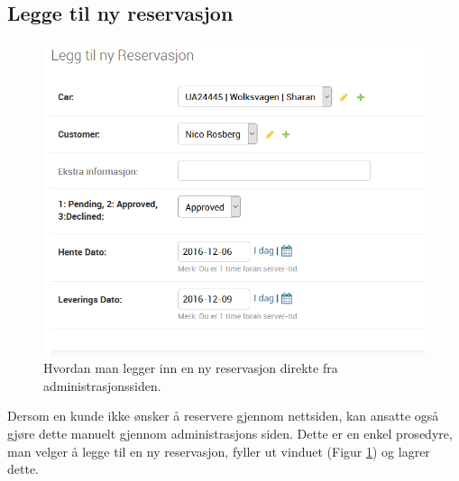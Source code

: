 \subsection*{Legge til ny reservasjon}




\begin{figure}[h!]
\begin{flushright}
\begin{minipage}{0.5\textwidth}
\begin{center}
    \includegraphics[width=1\textwidth]{Bilder/admin_ny_reservasjon.png}
    \caption[Ny reservasjon fra administrasjonsside]{Hvordan man legger inn en ny reservasjon direkte fra administrasjonssiden.}
    \label{fig:admin_new_res}
\end{center}
\end{minipage}
\end{flushright}
\end{figure}


%
\vspace{-7cm}
%
\begin{flushleft}
\begin{minipage}{0.4\textwidth}

%
%
Dersom en kunde ikke ønsker å reservere gjennom nettsiden, kan ansatte også gjøre dette manuelt gjennom administrasjons siden. Dette er en enkel prosedyre, man velger å legge til en ny reservasjon, fyller ut vinduet (Figur \ref{fig:admin_new_res}) og lagrer dette.

\end{minipage}
\end{flushleft}

